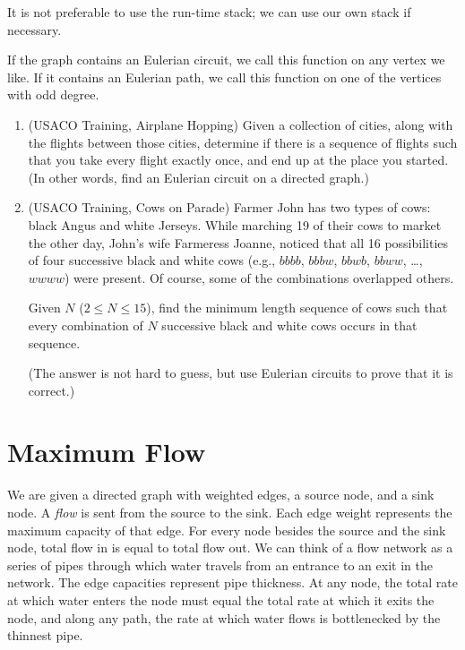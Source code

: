 \documentclass[11pt]{book}
\begin{document}
It is not preferable to use the run-time stack; we can use our own stack if necessary.

If the graph contains an Eulerian circuit, we call this function on any vertex we like. If it contains an Eulerian path, we call this function on one of the vertices with odd degree.

\begin{enumerate}

\item
(USACO Training, Airplane Hopping)
Given a collection of cities, along with the flights between those cities, determine if there is a sequence of flights such that you take every flight exactly once, and end up at the place you started. (In other words, find an Eulerian circuit on a directed graph.)

\item
(USACO Training, Cows on Parade)
Farmer John has two types of cows: black Angus and white Jerseys. While marching 19 of their cows to market the other day, John's wife Farmeress Joanne, noticed that all 16 possibilities of four successive black and white cows (e.g., $bbbb$, $bbbw$, $bbwb$, $bbww$, \ldots, $wwww$) were present. Of course, some of the combinations overlapped others.

Given $N$ ($2 \le N \le 15$), find the minimum length sequence of cows such that every combination of $N$ successive black and white cows occurs in that sequence.

(The answer is not hard to guess, but use Eulerian circuits to prove that it is correct.)

\end{enumerate}

\section{Maximum Flow}

We are given a directed graph with weighted edges, a source node, and a sink node. A \textit{flow} is sent from the source to the sink. Each edge weight represents the maximum capacity of that edge. For every node besides the source and the sink node, total flow in is equal to total flow out. We can think of a flow network as a series of pipes through which water travels from an entrance to an exit in the network. The edge capacities represent pipe thickness. At any node, the total rate at which water enters the node must equal the total rate at which it exits the node, and along any path, the rate at which water flows is bottlenecked by the thinnest pipe.
\end{document}
